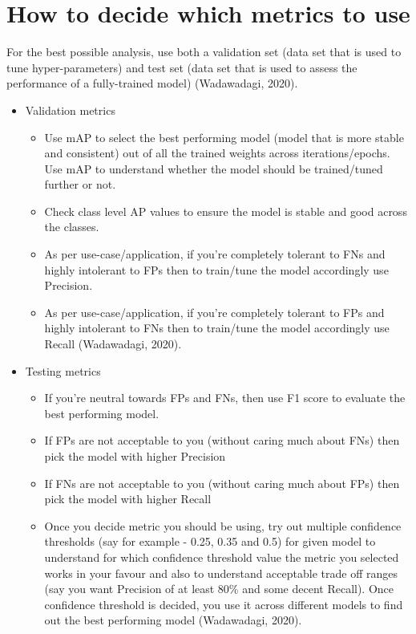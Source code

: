 \documentclass[]{article}
\begin{document}
\section{How to decide which metrics to use}
For the best possible analysis, use both a validation set (data set that is used to tune hyper-parameters) and test set (data set that is used to assess the performance of a fully-trained model) (Wadawadagi, 2020).
\begin{itemize}
\item Validation metrics
\begin{itemize}
\item Use mAP to select the best performing model (model that is more stable and consistent) out of all the trained weights across iterations/epochs. Use mAP to understand whether the model should be trained/tuned further or not.
\item Check class level AP values to ensure the model is stable and good across the classes.
\item As per use-case/application, if you're completely tolerant to FNs and highly intolerant to FPs then to train/tune the model accordingly use Precision.
\item As per use-case/application, if you're completely tolerant to FPs and highly intolerant to FNs then to train/tune the model accordingly use Recall (Wadawadagi, 2020).
\end{itemize}
\item Testing metrics
\begin{itemize}
\item If you're neutral towards FPs and FNs, then use F1 score to evaluate the best performing model.
\item If FPs are not acceptable to you (without caring much about FNs) then pick the model with higher Precision
\item If FNs are not acceptable to you (without caring much about FPs) then pick the model with higher Recall
\item Once you decide metric you should be using, try out multiple confidence thresholds (say for example - 0.25, 0.35 and 0.5) for given model to understand for which confidence threshold value the metric you selected works in your favour and also to understand acceptable trade off ranges (say you want Precision of at least 80\% and some decent Recall). Once confidence threshold is decided, you use it across different models to find out the best performing model (Wadawadagi, 2020).
\end{itemize}
\end{itemize}
\end{document}
